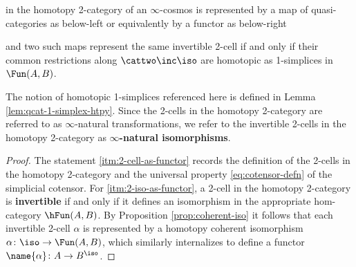 \begin{lemma}
\begin{enumerate}
  in the homotopy 2-category of an $\infty$-cosmos is represented by a map of quasi-categories  as below-left or equivalently by a functor as below-right
  \begin{center}
  \end{center} and two such maps represent the same invertible 2-cell if and only if their common restrictions along $\cattwo \inc \iso$ are homotopic as 1-simplices in $\Fun(A,B)$.
  \end{enumerate}
  \end{lemma}

  The notion of homotopic 1-simplices referenced here is defined in Lemma \ref{lem:qcat-1-simplex-htpy}. Since the 2-cells in the homotopy 2-category are referred to as $\infty$-natural transformations, we refer to the invertible 2-cells in the homotopy 2-category as \textbf{$\infty$-natural isomorphisms}.

  \begin{proof}
  The statement \ref{itm:2-cell-as-functor} records the definition of the 2-cells in the homotopy 2-category and the universal property \eqref{eq:cotensor-defn} of the simplicial cotensor.  For \ref{itm:2-iso-as-functor}, a 2-cell in the homotopy 2-category is \textbf{invertible} if and only if it defines an isomorphism in the appropriate hom-category $\hFun(A,B)$. By Proposition \ref{prop:coherent-iso} it follows that each invertible 2-cell $\alpha$ is represented by a homotopy coherent isomorphism ${\alpha} \colon \iso \to \Fun(A,B)$, which similarly internalizes to define a functor $\name{\alpha} \colon A \to B^\iso$.
  \end{proof}


